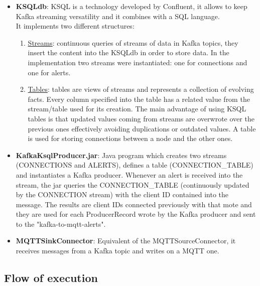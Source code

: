 \documentclass[table, 12pt]{article}
\begin{document}
\begin{itemize}
    \item \textbf{KSQLdb}: KSQL is a technology developed by Confluent, it allows to keep Kafka streaming versatility and it combines with a SQL language. \\It implements two different structures:
          \begin{enumerate}
              \item \underline{Streams}: continuous queries of streams of data in Kafka topics, they insert the content into the KSQLdb in order to store data. In the implementation two streams were instantiated: one for connections and one for alerts.
              \item \underline{Tables}: tables are views of streams and represents a collection of evolving facts. Every column specified into the table has a related value from the stream/table used for its creation. The main advantage of using KSQL tables is that updated values coming from streams are overwrote over the previous ones effectively avoiding duplications or outdated values. A table is used for storing connections between a node and the other ones.
          \end{enumerate}
    \item \textbf{KafkaKsqlProducer.jar}: Java program which creates two streams (CONNECTIONS and ALERTS), defines a table (CONNECTION\_TABLE) and instantiates a Kafka producer. Whenever an alert is received into the stream, the jar queries the CONNECTION\_TABLE (continuously updated by the CONNECTION stream) with the client ID contained into the message. The results are client IDs connected previously with that mote and they are used for each ProducerRecord wrote by the Kafka producer and sent to the "kafka-to-mqtt-alerts".
    \item \textbf{MQTTSinkConnector}: Equivalent of the MQTTSourceConnector, it receives messages from a Kafka topic and writes on a MQTT one.

\end{itemize}


\subsection{Flow of execution}
\end{document}
